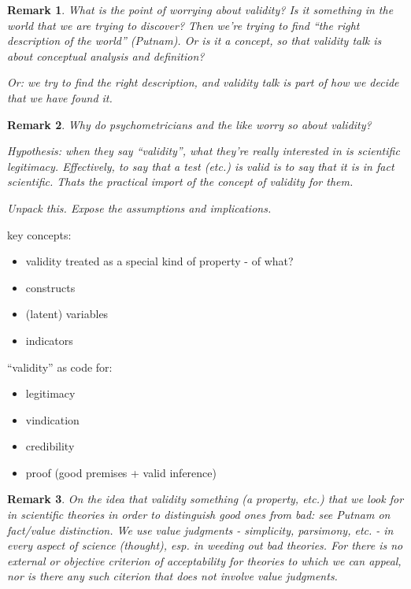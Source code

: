 \documentclass[11pt,twoside]{article}
\newtheorem{remark}{Remark}
\begin{document}
\begin{remark}
What is the point of worrying about validity?  Is it something in the
world that we are trying to discover?  Then we're trying to find ``the
right description of the world'' (Putnam).  Or is it a concept, so
that validity talk is about conceptual analysis and definition?

Or: we try to find the right description, and validity talk is part of
how we decide that we have found it.

\end{remark}

\begin{remark}
Why do psychometricians and the like worry so about validity?

Hypothesis: when they say ``validity'', what they're really interested
in is scientific legitimacy.  Effectively, to say that a test (etc.)
is valid is to say that it is in fact scientific.  Thats the practical
import of the concept of validity for them.

Unpack this.  Expose the assumptions and implications.
\end{remark}

key concepts:

\begin{itemize}
\item validity treated as a special kind of property - of what?
\item constructs
\item (latent) variables
\item indicators
\end{itemize}

``validity'' as code for:

\begin{itemize}
\item legitimacy
\item vindication
\item credibility
\item proof (good premises + valid inference)
\end{itemize}

\begin{remark}
  On the idea that validity something (a property, etc.) that we look
  for in scientific theories in order to distinguish good ones from
  bad: see Putnam on fact/value distinction.  We use value judgments -
  simplicity, parsimony, etc. - in every aspect of science (thought),
  esp. in weeding out bad theories.  For there is no external or
  objective criterion of acceptability for theories to which we can
  appeal, nor is there any such citerion that does not involve value
  judgments.
\end{remark}
\end{document}

